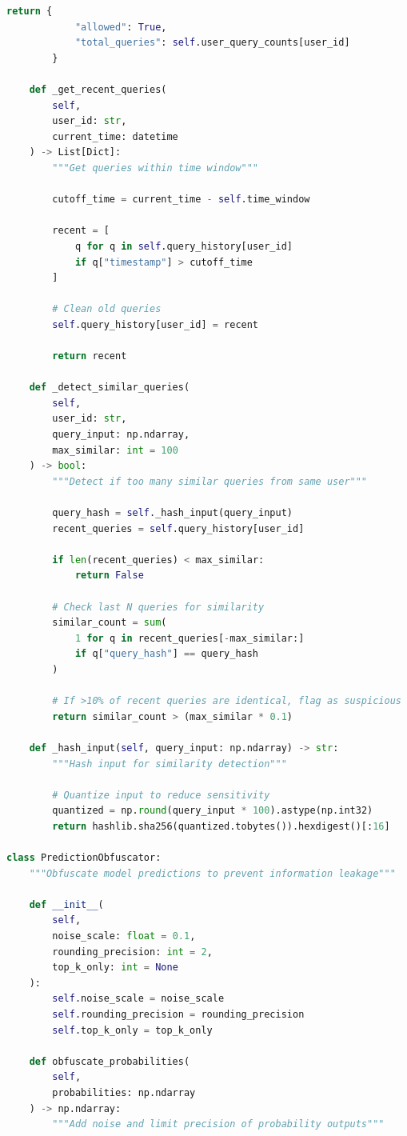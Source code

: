 \begin{lstlisting}[language=Python, caption=Model Stealing and Inversion Protection]
        return {
            "allowed": True,
            "total_queries": self.user_query_counts[user_id]
        }

    def _get_recent_queries(
        self,
        user_id: str,
        current_time: datetime
    ) -> List[Dict]:
        """Get queries within time window"""

        cutoff_time = current_time - self.time_window

        recent = [
            q for q in self.query_history[user_id]
            if q["timestamp"] > cutoff_time
        ]

        # Clean old queries
        self.query_history[user_id] = recent

        return recent

    def _detect_similar_queries(
        self,
        user_id: str,
        query_input: np.ndarray,
        max_similar: int = 100
    ) -> bool:
        """Detect if too many similar queries from same user"""

        query_hash = self._hash_input(query_input)
        recent_queries = self.query_history[user_id]

        if len(recent_queries) < max_similar:
            return False

        # Check last N queries for similarity
        similar_count = sum(
            1 for q in recent_queries[-max_similar:]
            if q["query_hash"] == query_hash
        )

        # If >10% of recent queries are identical, flag as suspicious
        return similar_count > (max_similar * 0.1)

    def _hash_input(self, query_input: np.ndarray) -> str:
        """Hash input for similarity detection"""

        # Quantize input to reduce sensitivity
        quantized = np.round(query_input * 100).astype(np.int32)
        return hashlib.sha256(quantized.tobytes()).hexdigest()[:16]

class PredictionObfuscator:
    """Obfuscate model predictions to prevent information leakage"""

    def __init__(
        self,
        noise_scale: float = 0.1,
        rounding_precision: int = 2,
        top_k_only: int = None
    ):
        self.noise_scale = noise_scale
        self.rounding_precision = rounding_precision
        self.top_k_only = top_k_only

    def obfuscate_probabilities(
        self,
        probabilities: np.ndarray
    ) -> np.ndarray:
        """Add noise and limit precision of probability outputs"""


\end{lstlisting}
